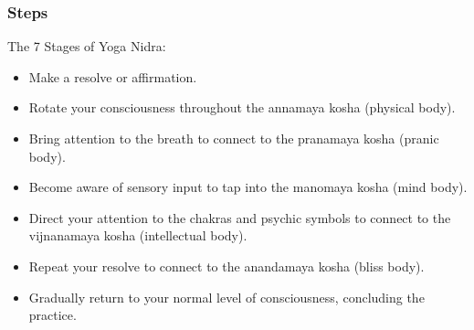 \begin{frame}[fragile]\frametitle{Steps}
The 7 Stages of Yoga Nidra:
	\begin{itemize}
	\item Make a resolve or affirmation.
	\item Rotate your consciousness throughout the annamaya kosha (physical body).
	\item Bring attention to the breath to connect to the pranamaya kosha (pranic body).
	\item Become aware of sensory input to tap into the manomaya kosha (mind body).
	\item Direct your attention to the chakras and psychic symbols to connect to the vijnanamaya kosha (intellectual body).
	\item Repeat your resolve to connect to the anandamaya kosha (bliss body).
	\item Gradually return to your normal level of consciousness, concluding the practice.
	\end{itemize}

\end{frame}



